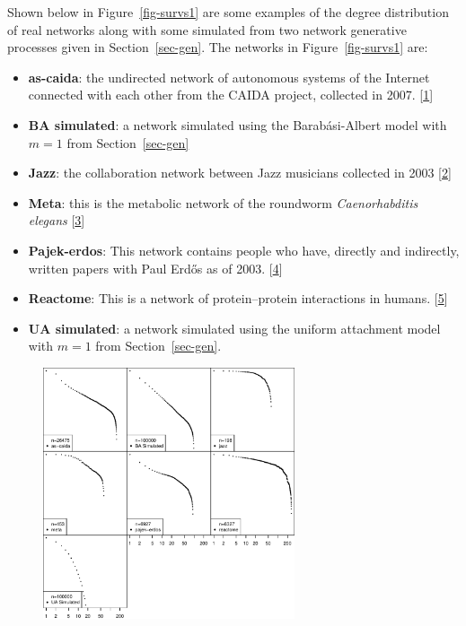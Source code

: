 \documentclass[
  10pt,
  a4paper,
]{scrreprt}
\providecommand{\tightlist}{%
  \setlength{\itemsep}{0pt}\setlength{\parskip}{0pt}}\usepackage{longtable,booktabs,array}
\theoremstyle{definition}
\theoremstyle{plain}
\theoremstyle{plain}
\theoremstyle{remark}
\begin{document}
{Shown below in Figure~\ref{fig-survs1} are some examples of the degree
distribution of real networks along with some simulated from two network
generative processes given in Section~\ref{sec-gen}. The networks in
Figure~\ref{fig-survs1} are:

\begin{itemize}
\tightlist
\item
  \textbf{as-caida}: the undirected network of autonomous systems of the
  Internet connected with each other from the CAIDA project, collected
  in 2007. {[}\protect\hyperlink{ref-caida}{1}{]}
\item
  \textbf{BA simulated}: a network simulated using the Barabási-Albert
  model with \(m=1\) from Section~\ref{sec-gen}
\item
  \textbf{Jazz}: the collaboration network between Jazz musicians
  collected in 2003 {[}\protect\hyperlink{ref-jazz}{2}{]}
\item
  \textbf{Meta}: this is the metabolic network of the roundworm
  \emph{Caenorhabditis elegans} {[}\protect\hyperlink{ref-meta}{3}{]}
\item
  \textbf{Pajek-erdos}: This network contains people who have, directly
  and indirectly, written papers with Paul Erdős as of 2003.
  {[}\protect\hyperlink{ref-pajek}{4}{]}
\item
  \textbf{Reactome}: This is a network of protein--protein interactions
  in humans. {[}\protect\hyperlink{ref-reactome}{5}{]}
\item
  \textbf{UA simulated}: a network simulated using the uniform
  attachment model with \(m=1\) from Section~\ref{sec-gen}.
\end{itemize}

\begin{figure}[H]

{\centering \includegraphics[width=0.66\textwidth,height=\textheight]{doc_files/figure-pdf/fig-survs1-1.pdf}

}
\end{figure}}
\end{document}
